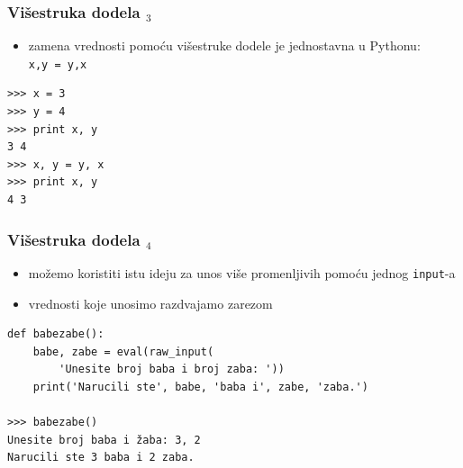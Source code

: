 \documentclass[utf8,compress]{beamer}
\begin{document}


\begin{frame}[fragile]
  \frametitle{Višestruka dodela $_3$}
  \begin{itemize}
    \item zamena vrednosti pomoću višestruke dodele je jednostavna u Pythonu: \\
      \texttt{x,y = y,x}
  \end{itemize}
\begin{verbatim}
>>> x = 3
>>> y = 4
>>> print x, y
3 4
>>> x, y = y, x
>>> print x, y
4 3
\end{verbatim}
\end{frame}

\begin{frame}[fragile]
  \frametitle{Višestruka dodela $_4$}
  \begin{itemize}
    \item možemo koristiti istu ideju za unos više promenljivih pomoću jednog \texttt{input}-a
    \item vrednosti koje unosimo razdvajamo zarezom
  \end{itemize}
\begin{verbatim}
def babezabe():
    babe, zabe = eval(raw_input(
        'Unesite broj baba i broj zaba: '))
    print('Narucili ste', babe, 'baba i', zabe, 'zaba.')

>>> babezabe()
Unesite broj baba i žaba: 3, 2
Narucili ste 3 baba i 2 zaba.
\end{verbatim}
\end{frame}
\end{document}
